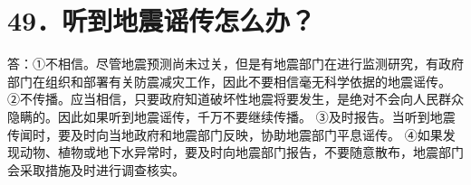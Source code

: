 \documentclass[a4paper,10pt,english]{sphinxmanual}
\begin{document}
\section{49．听到地震谣传怎么办？}
\label{\detokenize{index:id55}}
答：①不相信。尽管地震预测尚未过关，但是有地震部门在进行监测研究，有政府部门在组织和部署有关防震减灾工作，因此不要相信毫无科学依据的地震谣传。
②不传播。应当相信，只要政府知道破坏性地震将要发生，是绝对不会向人民群众隐瞒的。因此如果听到地震谣传，千万不要继续传播。
③及时报告。当听到地震传闻时，要及时向当地政府和地震部门反映，协助地震部门平息谣传。
④如果发现动物、植物或地下水异常时，要及时向地震部门报告，不要随意散布，地震部门会采取措施及时进行调查核实。



\renewcommand{\indexname}{索引}
\printindex
\end{document}
